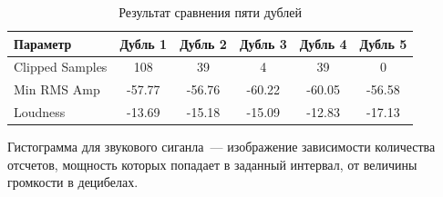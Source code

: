 \documentclass{beamer}
\begin{document}
\begin{frame}
\end{frame}   

\begin{frame}
\begin{table}[ht]
  \caption{Результат сравнения пяти дублей}
  \begin{center}
  \begin{tabular}{|l|c|c|c|c|c|}
    \hline Параметр 				& Дубль 1 	& Дубль 2 	& Дубль 3 	& Дубль 4 	& Дубль 5\\
    \hline Clipped Samples & 108 		& 39 		& 4 		& 39 		& 0\\
    \hline Min RMS Amp 	& -57.77	& -56.76    & -60.22	& -60.05	& -56.58\\    
    \hline Loudness 				& -13.69	& -15.18	& -15.09	& -12.83	& -17.13\\    
    \hline 
  \end{tabular}
  \end{center}  
  \label{table-fivedoubles-01}
\end{table}
\end{frame}   

\begin{frame}
Гистограмма для звукового сиганла~--- изображение зависимости количества отсчетов, мощность которых попадает в заданный интервал, от величины громкости в децибелах.

\end{frame}   
\end{document}
